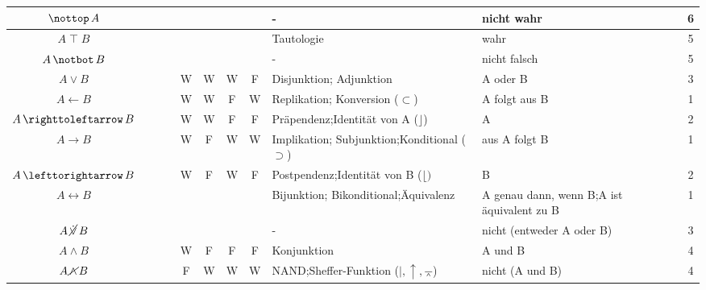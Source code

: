 \documentclass[english,ngerman,parskip=half,headsepline,footsepline]{scrreprt}
\newcommand{\texttrue}{W}
\newcommand{\textfalse}{F}
\newcommand{\lnutrue}{\operatorname{\nottop}}  %
\newcommand{\lbtrue}{\operatorname{\top}}              %
\newcommand{\lnbfalse}{\operatorname{\notbot}}         %
\newcommand{\lnxor}{\operatorname{\cancel{\lxor}}}     %
\newcommand{\lleftimp}{\operatorname{\leftarrow}}      %
\newcommand{\lleft}{\operatorname{\righttoleftarrow}}  %
\newcommand{\limp}{\operatorname{\rightarrow}}         %
\newcommand{\lright}{\operatorname{\lefttorightarrow}} %
\newcommand{\lequiv}{\operatorname{\leftrightarrow}}   %
\newcommand{\lnand}{\operatorname{\cancel{\land}}}     %
\newcommand{\lxor}{\operatorname{\dot{\lor}}}          %
\begin{document}
\begin{table}
\begin{threeparttable}
\begin{tabularx}{\linewidth}{c||c:cc:cccc|X:X|c|}
				\gapline %
				$\lnutrue A$&&&&&&&&-&nicht wahr&6\\
				\hline %
				$A\lbtrue B$&&&&\mrW&\mrW&\mrW&\mrW&Tautologie&wahr&5\\
				\gapline %
				$A\lnbfalse B$&&&&&&&&-&nicht falsch&5\\
				\tableline %
				$A\lor B$&&&&\texttrue&\texttrue&\texttrue&\textfalse&Disjunktion; Adjunktion&A oder B&3\\
				\tableline %
				$A\lleftimp B$&&&&\texttrue&\texttrue&\textfalse&\texttrue&Replikation; Konversion ($\subset$)&A folgt aus B&1\\
				\tableline %
				$A\lleft B$&&&&\texttrue&\texttrue&\textfalse&\textfalse&Präpendenz;\newline Identität von A ($\rfloor$)&A&2\\
				\tablegroup %
				$A\limp B$&&&&\texttrue&\textfalse&\texttrue&\texttrue&Implikation; Subjunktion;\newline Konditional ($\supset$)&aus A folgt B&1\\
				\tableline %
				$A\lright B$&&&&\texttrue&\textfalse&\texttrue&\textfalse&Postpendenz;\newline Identität von B ($\lfloor)$&B&2\\
				\tableline %
				$A\lequiv B$&&&&\mrW&\mrF&\mrF&\mrW&Bijunktion; Bikonditional;\newline Äquivalenz&A genau dann, wenn B;\newline A ist äquivalent zu B&1\\
				\gapline %
				$A\lnxor B$&&&&&&&&-&nicht (entweder A oder B)&3\\
				\tableline %
				$A\land B$&&&&\texttrue&\textfalse&\textfalse&\textfalse&Konjunktion&A und B&4\\
				\tablegroup %
				$A\lnand B$&&&&\textfalse&\texttrue&\texttrue&\texttrue&NAND;\newline Sheffer-Funktion ($\mid, \uparrow, \barwedge$)&nicht (A und B)&4\\

\end{tabularx}
\end{threeparttable}
\end{table}
\end{document}
